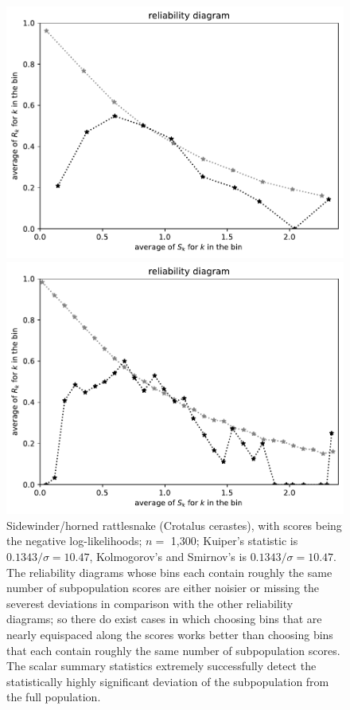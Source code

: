 \documentclass{article}
\begin{document}
\begin{figure}
\begin{centering}
\parbox{\imsize}{\includegraphics[width=\imsize]
{./codes/unweighted/nll-1-68-sidewinder-horned-rattlesnake-Crotalus-cerastesequiscore10}}
\quad\quad
\parbox{\imsize}{\includegraphics[width=\imsize]
{./codes/unweighted/nll-1-68-sidewinder-horned-rattlesnake-Crotalus-cerastesequiscore30}}

\end{centering}
\caption{Sidewinder/horned rattlesnake (Crotalus cerastes),
         with scores being the negative log-likelihoods;
         $n =$ 1,300; Kuiper's statistic is $0.1343 / \sigma = 10.47$,
         Kolmogorov's and Smirnov's is $0.1343 / \sigma = 10.47$.
The reliability diagrams whose bins each contain roughly the same number
of subpopulation scores are either noisier or missing the severest deviations
in comparison with the other reliability diagrams;
so there do exist cases in which choosing bins that are nearly equispaced
along the scores works better than choosing bins that each contain roughly
the same number of subpopulation scores.
The scalar summary statistics extremely successfully
detect the statistically highly significant deviation
of the subpopulation from the full population.
}
\label{sidewinder-horned-rattlesnake-Crotalus-cerastes-nll}
\end{figure}
\end{document}
